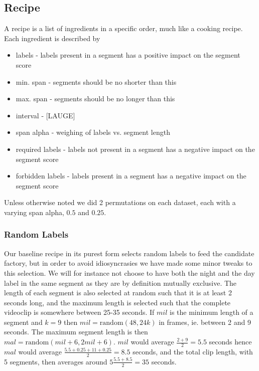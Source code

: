 \subsection{Recipe}
%
A recipe is a list of ingredients in a specific order, much like a cooking recipe. Each ingredient is described by
\begin{itemize}
\item labels - labels present in a segment has a positive impact on the segment score
\item min. span - segments should be no shorter than this
\item max. span - segments should be no longer than this
\item interval - [LAUGE]
\item span alpha - weighing of labels vs. segment length
\item required labels - labels not present in a segment has a negative impact on the segment score
\item forbidden labels - labels present in a segment has a negative impact on the segment score
\end{itemize}
Unless otherwise noted we did 2 permutations on each dataset, each with a varying span alpha, $0.5$ and $0.25$.
%
%
%
\subsubsection{Random Labels}
% 
Our baseline recipe in its purest form selects random labels to feed the candidate factory, but in order to avoid idiosyncrasies we have made some minor tweaks to this selection. We will for instance not choose to have both the night and the day label in the same segment as they are by definition mutually exclusive. The length of each segment is also selected at random such that it is at least 2 seconds long, and the maximum length is selected such that the complete videoclip is somewhere between 25-35 seconds. If $mil$ is the minimum length of a segment and $k=9$ then $mil=\text{random}(48,24k)$ in frames, ie. between 2 and 9 seconds. The maximum segment length is then $mal=\text{random}(mil+6, 2mil+6)$. $mil$ would average $\frac{2+9}{2}=5.5$ seconds hence $mal$ would average $\frac{5.5+0.25+11+0.25}{2}=8.5$ seconds, and the total clip length, with 5 segments, then averages around $5\frac{5.5+8.5}{2}=35$ seconds.
%
